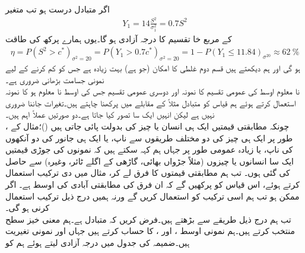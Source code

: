 اگر متبادل درست ہو تب متغیر
\begin{align*}
Y_1=14\frac{S^2}{\sigma_1^2}=0.7S^2
\end{align*}
کے مربع خا تقسیم کا درجہ آزادی  ہو گا۔یوں ہمارے پرکھ کی طاقت
\begin{align*}
\eta=P(S^2>c^*)_{\sigma^2=20}=P(Y_1>0.7c^*)_{\sigma^2=20}=1-P(Y_1\le 11.84)_{\sigma^20}\approx \SI{62}{\percent}
\end{align*}
ہو گی اور ہم دیکھتے ہیں قسم دوم غلطی کا امکان (جو  ہے) بہت زیادہ ہے جس کو کم کرنے کے لیے نمونی جسامت بڑھانی ضروری ہے۔
\quad {}\\
نا معلوم اوسط  کی عمومی تقسیم کا نمونہ  اور دوسری عمومی تقسیم جس کی اوسط  نا معلوم ہو کا نمونہ  استعمال کرتے ہوئے ہم قیاس  کو متبادل مثلاً   کے مقابلے میں پرکھنا چاہتے ہیں۔تغیرات جاننا ضروری نہیں ہے لیکن انہیں ایک سا  تصور کیا جاتا ہے۔دو صورتیں عملاً اہم ہیں۔\\
\quad
{}، چونکہ مطابقتی قیمتیں ایک ہی انسان یا چیز کی بدولت پائی جاتی ہیں ()؛مثال کے طور پر ایک ہی چیز کی دو مختلف طریقوں سے ناپ، یا ایک ہی جانور کی دو آنکھوں کی ناپ، یا زیادہ عمومی طور پر جہاں ہم کہہ سکتے ہیں کہ  نمونوں کی جوڑی قیمتیں  ایک  سا  انسانوں یا چیزوں (مثلاً جڑواں بھائی،  گاڑھی کے اگلے ٹائر، وغیرہ) سے حاصل کی گئی ہوں۔ تب ہم مطابقتی قیمتوں کا فرق لے کر، مثال  میں دی ترکیب استعمال کرتے ہوئے، اس قیاس کو پرکھیں گے کہ ان فرق کی مطابقتی آبادی  کی اوسط   ہے۔  اگر ممکن ہو تب ہم اسی ترکیب کو استعمال کریں گے ورنہ ہمیں درج ذیل ترکیب استعمال کرنی ہو گی۔\\
\quad
{} تب ہم درج ذیل طریقے سے بڑھتے ہیں۔فرض کریں کہ متبادل  ہے۔ہم معنی خیز سطح  منتخب کرتے ہیں۔ہم نمونی اوسط ،  اور ،  کا حساب کرتے ہیں جہاں  اور  نمونی تغیریت ہیں۔ضمیمہ  کی جدول  میں  درجہ آزادی لیتے ہوئے ہم  کو
